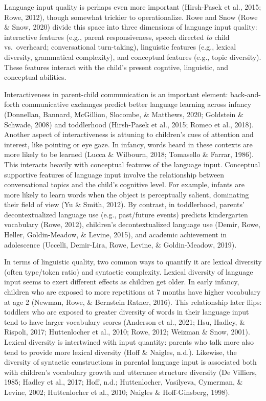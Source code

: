 \documentclass[english,man]{apa6}
\begin{document}
Language input quality is perhaps even more important (Hirsh-Pasek et al., 2015; Rowe, 2012), though somewhat trickier to operationalize. Rowe and Snow (Rowe \& Snow, 2020) divide this space into three dimensions of language input quality: interactive features (e.g., parent responsiveness, speech directed \emph{to} child vs.~overheard; conversational turn-taking), linguistic features (e.g., lexical diversity, grammatical complexity), and conceptual features (e.g., topic diversity). These features interact with the child's present cogntive, linguistic, and conceptual abilities.

Interactiveness in parent-child communication is an important element: back-and-forth communicative exchanges predict better language learning across infancy (Donnellan, Bannard, McGillion, Slocombe, \& Matthews, 2020; Goldstein \& Schwade, 2008) and toddlerhood (Hirsh-Pasek et al., 2015; Romeo et al., 2018). Another aspect of interactiveness is attuning to children's cues of attention and interest, like pointing or eye gaze. In infancy, words heard in these contexts are more likely to be learned (Lucca \& Wilbourn, 2018; Tomasello \& Farrar, 1986). This interacts heavily with conceptual features of the language input. Conceptual supportive features of language input involve the relationship between conversational topics and the child's cognitive level. For example, infants are more likely to learn words when the object is perceptually salient, dominating their field of view (Yu \& Smith, 2012). By contrast, in toddlerhood, parents' decontextualized language use (e.g., past/future events) predicts kindergarten vocabulary (Rowe, 2012), children's decontextualized language use (Demir, Rowe, Heller, Goldin-Meadow, \& Levine, 2015), and academic achievement in adolescence (Uccelli, Demir-Lira, Rowe, Levine, \& Goldin-Meadow, 2019).

In terms of linguistic quality, two common ways to quantify it are lexical diversity (often type/token ratio) and syntactic complexity. Lexical diversity of language input seems to exert different effects as children get older. In early infancy, children who are exposed to more repetitions at 7 months have higher vocabulary at age 2 (Newman, Rowe, \& Bernstein Ratner, 2016). This relationship later flips: toddlers who are exposed to greater diversity of words in their language input tend to have larger vocabulary scores (Anderson et al., 2021; Hsu, Hadley, \& Rispoli, 2017; Huttenlocher et al., 2010; Rowe, 2012; Weizman \& Snow, 2001). Lexical diversity is intertwined with input quantity: parents who talk more also tend to provide more lexical diversity (Hoff \& Naigles, n.d.). Likewise, the diversity of syntactic constructions in parental language input is associated both with children's vocabulary growth and utterance structure diversity (De Villiers, 1985; Hadley et al., 2017; Hoff, n.d.; Huttenlocher, Vasilyeva, Cymerman, \& Levine, 2002; Huttenlocher et al., 2010; Naigles \& Hoff-Ginsberg, 1998).
\end{document}
